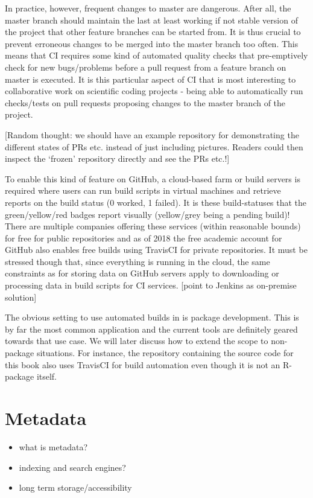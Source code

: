 \documentclass[]{book}
\providecommand{\tightlist}{%
  \setlength{\itemsep}{0pt}\setlength{\parskip}{0pt}}
\begin{document}
In practice, however, frequent changes to master are dangerous. After
all, the master branch should maintain the last at least working if not
stable version of the project that other feature branches can be started
from. It is thus crucial to prevent erroneous changes to be merged into
the master branch too often. This means that CI requires some kind of
automated quality checks that pre-emptively check for new bugs/problems
before a pull request from a feature branch on master is executed. It is
this particular aspect of CI that is most interesting to collaborative
work on scientific coding projects - being able to automatically run
checks/tests on pull requests proposing changes to the master branch of
the project.

{[}Random thought: we should have an example repository for
demonstrating the different states of PRs etc. instead of just including
pictures. Readers could then inspect the `frozen' repository directly
and see the PRs etc.!{]}

To enable this kind of feature on GitHub, a cloud-based farm or build
servers is required where users can run build scripts in virtual
machines and retrieve reports on the build status (0 worked, 1 failed).
It is these build-statuses that the green/yellow/red badges report
visually (yellow/grey being a pending build)! There are multiple
companies offering these services (within reasonable bounds) for free
for public repositories and as of 2018 the free academic account for
GitHub also enables free builds using TravisCI for private repositories.
It must be stressed though that, since everything is running in the
cloud, the same constraints as for storing data on GitHub servers apply
to downloading or processing data in build scripts for CI services.
{[}point to Jenkins as on-premise solution{]}

The obvious setting to use automated builds in is package development.
This is by far the most common application and the current tools are
definitely geared towards that use case. We will later discuss how to
extend the scope to non-package situations. For instance, the repository
containing the source code for this book also uses TravisCI for build
automation even though it is not an R-package itself.

\chapter{Metadata}\label{chptr-metadata}

\begin{itemize}
\tightlist
\item
  what is metadata?
\item
  indexing and search engines?
\item
  long term storage/accessibility
\end{itemize}
\end{document}

